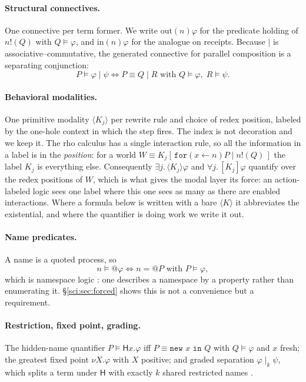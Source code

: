 \paragraph{Structural connectives.} One connective per term former. We write $\mathrm{out}(n)\varphi$
for the predicate holding of $n!(Q)$ with $Q \models \varphi$, and $\mathrm{in}(n)\varphi$ for the
analogue on receipts. Because $\mid$ is associative--commutative, the generated connective for
parallel composition is a separating conjunction:
\[
P \models \varphi \mid \psi \iff P \equiv Q \mid R \text{ with } Q \models \varphi,\; R \models \psi .
\]

\paragraph{Behavioral modalities.} One primitive modality $\langle K_j \rangle$ per rewrite rule and
choice of redex position, labeled by the one-hole context in which the step fires. The index is not
decoration and we keep it. The rho calculus has a single interaction rule, so all the information in
a label is in the \emph{position}: for a world $W \equiv K_j[\,\texttt{for}(x \leftarrow n)P \mid
n!(Q)\,]$ the label $K_j$ is everything else. Consequently $\exists j.\,\langle K_j\rangle\varphi$
and $\forall j.\,[K_j]\varphi$ quantify over the redex positions of $W$, which is what gives the
modal layer its force: an action-labeled logic sees one label where this one sees as many as there
are enabled interactions. Where a formula below is written with a bare $\langle K\rangle$ it
abbreviates the existential, and where the quantifier is doing work we write it out.

\paragraph{Name predicates.} A name is a quoted process, so
\[
n \models @\varphi \iff n = @P \text{ with } P \models \varphi ,
\]
which is namespace logic \cite{NamespaceLogic}: one describes a namespace by a property rather than
enumerating it. \S\ref{sci:sec:forced} shows this is not a convenience but a requirement.

\paragraph{Restriction, fixed point, grading.} The hidden-name quantifier
$P \models \mathsf{H}x.\varphi$ iff $P \equiv \texttt{new } x \texttt{ in } Q$ with
$Q \models \varphi$ and $x$ fresh; the greatest fixed point $\nu X.\varphi$ with $X$ positive; and
graded separation $\varphi \mid_k \psi$, which splits a term under $\mathsf{H}$ with exactly $k$
shared restricted names \cite[\S2.3]{ClassifierNote}.

